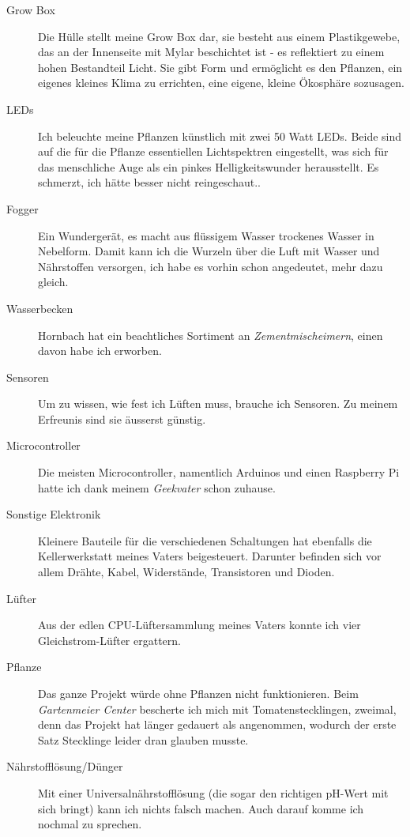 \documentclass[12pt,titlepage,a4paper]{article}
\begin{document}
\begin{description}
\item[Grow Box] Die Hülle stellt meine Grow Box dar, sie besteht aus einem Plastikgewebe, das an der Innenseite mit Mylar beschichtet ist - es reflektiert zu einem hohen Bestandteil Licht. Sie gibt Form und ermöglicht es den Pflanzen, ein eigenes kleines Klima zu errichten, eine eigene, kleine Ökosphäre sozusagen.
\item[LEDs] Ich beleuchte meine Pflanzen künstlich mit zwei 50 Watt LEDs. Beide sind auf die für die Pflanze essentiellen Lichtspektren eingestellt, was sich für das menschliche Auge als ein pinkes Helligkeitswunder herausstellt. Es schmerzt, ich hätte besser nicht reingeschaut..
\item[Fogger] Ein Wundergerät, es macht aus flüssigem Wasser trockenes Wasser in Nebelform. Damit kann ich die Wurzeln über die Luft mit Wasser und Nährstoffen versorgen, ich habe es vorhin schon angedeutet, mehr dazu gleich.
\item[Wasserbecken] Hornbach hat ein beachtliches Sortiment an \textit{Zementmischeimern}, einen davon habe ich erworben.
\item[Sensoren] Um zu wissen, wie fest ich Lüften muss, brauche ich Sensoren. Zu meinem Erfreunis sind sie äusserst günstig.
\item[Microcontroller] Die meisten Microcontroller, namentlich Arduinos und einen Raspberry Pi hatte ich dank meinem \textit{Geekvater} schon zuhause.
\item[Sonstige Elektronik] Kleinere Bauteile für die verschiedenen Schaltungen hat ebenfalls die Kellerwerkstatt meines Vaters beigesteuert. Darunter befinden sich vor allem Drähte, Kabel, Widerstände, Transistoren und Dioden.
\item[Lüfter] Aus der edlen CPU-Lüftersammlung meines Vaters konnte ich vier Gleichstrom-Lüfter ergattern.
\item[Pflanze] Das ganze Projekt würde ohne Pflanzen nicht funktionieren. Beim \textit{Gartenmeier Center} bescherte ich mich mit Tomatenstecklingen, zweimal, denn das Projekt hat länger gedauert als angenommen, wodurch der erste Satz Stecklinge leider dran glauben musste.
\item[Nährstofflösung/Dünger] Mit einer Universalnährstofflösung (die sogar den richtigen pH-Wert mit sich bringt) kann ich nichts falsch machen. Auch darauf komme ich nochmal zu sprechen.
\end{description}
\end{document}
